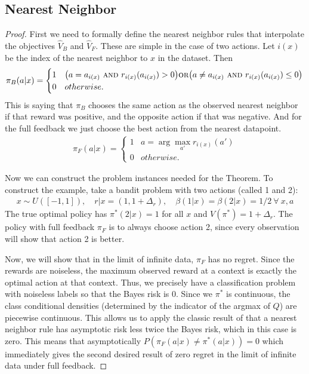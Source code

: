 \subsection{Nearest Neighbor}

\nn*

\begin{proof}
First we need to formally define the nearest neighbor rules that interpolate the objectives $ \hat V_B$ and $ \hat V_F$. These are simple in the case of two actions. Let $ i(x)$ be the index of the nearest neighbor to $ x$ in the dataset. Then
\begin{align}
    \pi_B(a|x) = \begin{cases}1 & \big(a = a_{i(x)} \ \textsc{and}\  r_{i(x)}(a_{i(x)}) > 0\big) \textsc{or} \big(a \neq a_{i(x)} \ \textsc{and}\  r_{i(x)}(a_{i(x)}) \leq 0\big) \\ 0 & otherwise.\end{cases}
\end{align}
This is saying that $ \pi_B$ chooses the same action as the observed nearest neighbor if that reward was positive, and the opposite action if that was negative.
And for the full feedback we just choose the best action from the nearest datapoint.
\begin{align}
    \pi_F(a|x) = \begin{cases}1 & a = \arg\max_{a'} r_{i(x)}(a')\\ 0 & otherwise. \end{cases}
\end{align}

Now we can construct the problem instances needed for the Theorem.
To construct the example, take a bandit problem with two actions (called 1 and 2):
\begin{align*}
    x \sim U([-1,1]), \quad r|x = (1, 1 + \Delta_r), \quad \beta(1|x) = \beta(2|x) = 1/2 \ \forall\ x,a
\end{align*}
The true optimal policy has $\pi^*(2|x) = 1$ for all $x$ and $ V(\pi^*) = 1+\Delta_r$.
The policy with full feedback $ \pi_F $ is to always choose action 2, since every observation will show that action 2 is better.


Now, we will show that in the limit of infinite data, $ \pi_F$ has no regret. Since the rewards are noiseless, the maximum observed reward at a context is exactly the optimal action at that context. Thus, we precisely have a classification problem with noiseless labels so that the Bayes risk is 0.
Since we $\pi^*$ is continuous, the class conditional densities (determined by the indicator of the argmax of $ Q$) are piecewise continuous.
This allows us to apply the classic result of \cite{cover1967} that a nearest neighbor rule has asymptotic risk less twice the Bayes risk, which in this case is zero. This means that asymptotically $ P(\pi_F(a|x) \neq \pi^*(a|x)) = 0$ which immediately gives the second desired result of zero regret in the limit of infinite data under full feedback.


\end{proof}

